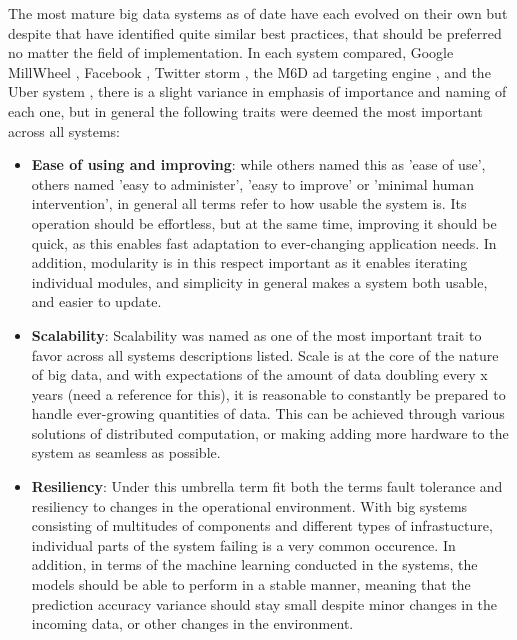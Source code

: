 The most mature big data systems as of date have each evolved on their own but despite that have identified quite similar best practices, that should be preferred no matter the field of implementation. In each system compared, Google MillWheel \cite{millwheel}, Facebook \cite{facebook}, Twitter storm \cite{storm@twitter}, the M6D ad targeting engine \cite{designprinciples}, and the Uber system \cite{uber}, there is a slight variance in emphasis of importance and naming of each one, but in general the following traits were deemed the most important across all systems:

\begin{itemize}
    \item \textbf{Ease of using and improving}: while others named this as 'ease of use', others named 'easy to administer', 'easy to improve' or 'minimal human intervention', in general all terms refer to how usable the system is. Its operation should be effortless, but at the same time, improving it should be quick, as this enables fast adaptation to ever-changing application needs. In addition, modularity is in this respect important as it enables iterating individual modules, and simplicity in general makes a system both usable, and easier to update.
    \item \textbf{Scalability}: Scalability was named as one of the most important trait to favor across all systems descriptions listed. Scale is at the core of the nature of big data, and with expectations of the amount of data doubling every x years (need a reference for this), it is reasonable to constantly be prepared to handle ever-growing quantities of data. This can be achieved through various solutions of distributed computation, or making adding more hardware to the system as seamless as possible.
    \item \textbf{Resiliency}: Under this umbrella term fit both the terms fault tolerance and resiliency to changes in the operational environment. With big systems consisting of multitudes of components and different types of infrastucture, individual parts of the system failing is a very common occurence. In addition, in terms of the machine learning conducted in the systems, the models should be able to perform in a stable manner, meaning that the prediction accuracy variance should stay small despite minor changes in the incoming data, or other changes in the environment.
\end{itemize}


